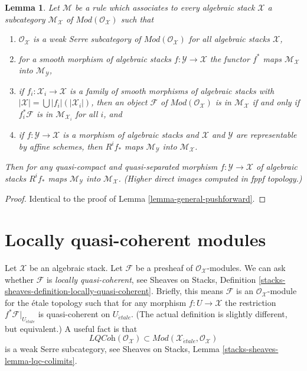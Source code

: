 \documentclass{stacks-project}
\theoremstyle{plain}
\newtheorem{lemma}[subsection]{Lemma}
\theoremstyle{definition}
\theoremstyle{remark}
\numberwithin{equation}{subsection}
\def\etale{{\acute{e}tale}}
\begin{document}
\begin{lemma}
\label{lemma-general-pushforward-fppf}
Let $\mathcal{M}$ be a rule which associates to every algebraic stack
$\mathcal{X}$ a subcategory $\mathcal{M}_\mathcal{X}$ of
$\textit{Mod}(\mathcal{O}_\mathcal{X})$
such that
\begin{enumerate}
\item $\mathcal{O}_\mathcal{X}$ is a weak Serre subcategory
of $\textit{Mod}(\mathcal{O}_\mathcal{X})$
for all algebraic stacks $\mathcal{X}$,
\item for a smooth morphism of algebraic stacks
$f : \mathcal{Y} \to \mathcal{X}$ the functor $f^*$ maps
$\mathcal{M}_\mathcal{X}$ into $\mathcal{M}_\mathcal{Y}$,
\item if $f_i : \mathcal{X}_i \to \mathcal{X}$ is a family of smooth
morphisms of algebraic stacks with
$|\mathcal{X}| = \bigcup |f_i|(|\mathcal{X}_i|)$, then an object
$\mathcal{F}$ of $\textit{Mod}(\mathcal{O}_\mathcal{X})$
is in $\mathcal{M}_\mathcal{X}$ if and only if
$f_i^*\mathcal{F}$ is in $\mathcal{M}_{\mathcal{X}_i}$ for all $i$, and
\item if $f : \mathcal{Y} \to \mathcal{X}$ is a morphism of algebraic
stacks and $\mathcal{X}$ and $\mathcal{Y}$ are representable
by affine schemes, then $R^if_*$ maps $\mathcal{M}_\mathcal{Y}$
into $\mathcal{M}_\mathcal{X}$.
\end{enumerate}
Then for any quasi-compact and quasi-separated morphism 
$f : \mathcal{Y} \to \mathcal{X}$ of algebraic stacks
$R^if_*$ maps $\mathcal{M}_\mathcal{Y}$
into $\mathcal{M}_\mathcal{X}$. (Higher direct images computed in fppf
topology.)
\end{lemma}

\begin{proof}
Identical to the proof of Lemma \ref{lemma-general-pushforward}.
\end{proof}


\section{Locally quasi-coherent modules}
\label{section-locally-quasi-coherent}

\noindent
Let $\mathcal{X}$ be an algebraic stack. Let $\mathcal{F}$ be a presheaf
of $\mathcal{O}_\mathcal{X}$-modules. We can ask whether $\mathcal{F}$
is {\it locally quasi-coherent}, see
Sheaves on Stacks, Definition
\ref{stacks-sheaves-definition-locally-quasi-coherent}.
Briefly, this means $\mathcal{F}$ is an $\mathcal{O}_\mathcal{X}$-module
for the \'etale topology such that for any morphism $f : U \to \mathcal{X}$
the restriction $f^*\mathcal{F}|_{U_\etale}$ is quasi-coherent
on $U_\etale$. (The actual definition is slightly different, but
equivalent.) A useful fact is that
$$
\textit{LQCoh}(\mathcal{O}_\mathcal{X}) \subset
\textit{Mod}(\mathcal{X}_\etale, \mathcal{O}_\mathcal{X})
$$
is a weak Serre subcategory, see
Sheaves on Stacks, Lemma \ref{stacks-sheaves-lemma-lqc-colimits}.
\end{document}
